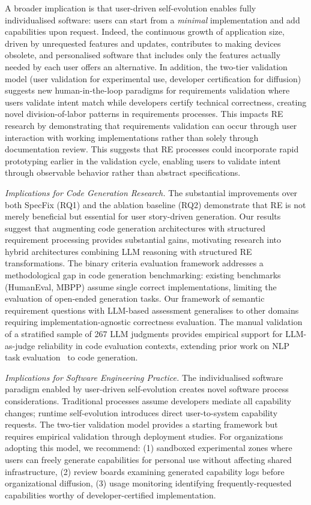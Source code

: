 \documentclass[sigconf,screen]{acmart}
\begin{document}
A broader implication is that user-driven self-evolution enables fully individualised software: users can  start from a \textit{minimal} implementation and add capabilities upon request. Indeed, the continuous growth of application size, driven by unrequested features and updates, contributes to making devices obsolete, and personalised software that includes only the features actually needed by each user offers an alternative. In addition, the two-tier validation model (user validation for experimental use, developer certification for diffusion) suggests new human-in-the-loop paradigms for requirements validation where users validate intent match while developers certify technical correctness, creating novel division-of-labor patterns in requirements processes. This impacts RE research by demonstrating that requirements validation can occur through user interaction with working implementations rather than solely through documentation review. This suggests that RE processes could incorporate rapid prototyping earlier in the validation cycle, enabling users to validate intent through observable behavior rather than abstract specifications.

\textit{Implications for Code Generation Research.} The substantial improvements over both SpecFix (RQ1) and the ablation baseline (RQ2) demonstrate that RE is not merely beneficial but essential for user story-driven generation.
Our results suggest that augmenting code generation architectures with structured requirement processing provides substantial gains, motivating research into hybrid architectures combining LLM reasoning with structured RE transformations. The binary criteria evaluation framework addresses a methodological gap in code generation benchmarking: existing benchmarks (HumanEval, MBPP) assume single correct implementations, limiting the evaluation of open-ended generation tasks. Our framework of semantic requirement questions with LLM-based assessment generalises to other domains requiring implementation-agnostic correctness evaluation. The manual validation of a stratified sample of 267 LLM judgments provides empirical support for LLM-as-judge reliability in code evaluation contexts, extending prior work on NLP task evaluation~\cite{checkeval2025} to code generation.

\textit{Implications for Software Engineering Practice.} The individualised software paradigm enabled by user-driven self-evolution creates novel software process considerations. Traditional processes assume developers mediate all capability changes; runtime self-evolution introduces direct user-to-system capability requests.
The two-tier validation model provides a starting framework but requires empirical validation through deployment studies. For organizations adopting this model, we recommend: (1) sandboxed experimental zones where users can freely generate capabilities for personal use without affecting shared infrastructure, (2) review boards examining generated capability logs before organizational diffusion, (3) usage monitoring identifying frequently-requested capabilities worthy of developer-certified implementation.
\end{document}
